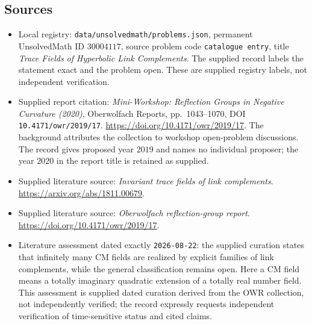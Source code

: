 \documentclass[11pt]{article}
\begin{document}
\subsection{Sources}
\begin{itemize}
\item Local registry: \texttt{data/unsolvedmath/problems.json}, permanent UnsolvedMath ID \(30004117\), source problem code \texttt{catalogue entry}, title \emph{Trace Fields of Hyperbolic Link Complements}. The supplied record labels the statement exact and the problem open. These are supplied registry labels, not independent verification.
\item Supplied report citation: \emph{Mini-Workshop: Reflection Groups in Negative Curvature (2020)}, Oberwolfach Reports, pp.\ 1043--1070, DOI \texttt{10.4171/owr/2019/17}. \url{https://doi.org/10.4171/owr/2019/17}. The background attributes the collection to workshop open-problem discussions. The record gives proposed year \(2019\) and names no individual proposer; the year \(2020\) in the report title is retained as supplied.
\item Supplied literature source: \emph{Invariant trace fields of link complements}. \url{https://arxiv.org/abs/1811.00679}.
\item Supplied literature source: \emph{Oberwolfach reflection-group report}. \url{https://doi.org/10.4171/owr/2019/17}.
\item Literature assessment dated exactly \texttt{2026-08-22}: the supplied curation states that infinitely many CM fields are realized by explicit families of link complements, while the general classification remains open. Here a CM field means a totally imaginary quadratic extension of a totally real number field. This assessment is supplied dated curation derived from the OWR collection, not independently verified; the record expressly requests independent verification of time-sensitive status and cited claims.
\end{itemize}
\end{document}
